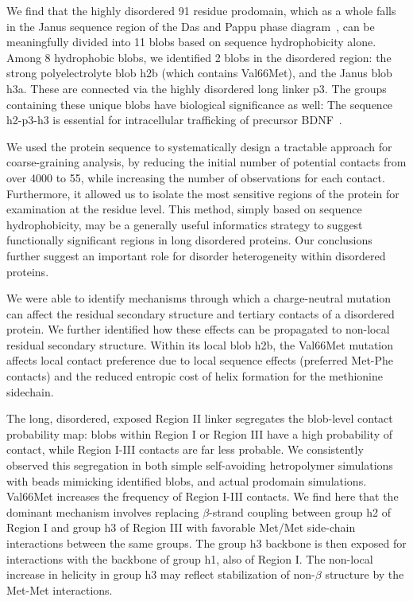 \documentclass[10pt,letterpaper]{article}
\begin{document}
We find that the highly disordered 91 residue prodomain, which as a whole falls in the Janus sequence region of the Das and Pappu phase diagram~\cite{Das2013}, can be meaningfully divided into 11 blobs based on sequence hydrophobicity alone. Among 8 hydrophobic blobs, we identified 2 blobs in the disordered region: the strong polyelectrolyte blob h2b (which contains Val66Met), and the Janus blob h3a. These are connected via the highly disordered long linker p3. The groups containing these unique blobs have biological significance as well: The sequence h2-p3-h3 is essential for intracellular trafficking of precursor BDNF~\cite{Chen2005}. 

We used the protein sequence to systematically design a tractable approach for coarse-graining analysis, by reducing the initial number of potential contacts from over 4000 to 55, while increasing the number of observations for each contact. Furthermore, it allowed us to isolate the most sensitive regions of the protein for examination at the residue level. This method, simply based on sequence hydrophobicity, may be a generally useful informatics strategy to suggest functionally significant regions in long disordered proteins. Our conclusions further suggest an important role for disorder heterogeneity within disordered proteins. 

We were able to identify mechanisms through which a charge-neutral mutation can affect the residual secondary structure and tertiary contacts of a disordered protein. We further identified how these effects can be propagated to non-local residual secondary structure. Within its local blob h2b, the Val66Met mutation affects local contact preference due to local sequence effects (preferred Met-Phe contacts) and the reduced entropic cost of helix formation for the methionine sidechain.

The long, disordered, exposed Region II linker segregates the blob-level contact probability map: blobs within Region I or Region III have a high probability of contact, while Region I-III contacts are far less probable. We consistently observed this segregation in both simple self-avoiding hetropolymer simulations with beads mimicking identified blobs, and actual prodomain simulations. Val66Met increases the frequency of Region I-III contacts. We find here that the dominant mechanism involves replacing $\beta$-strand coupling between group h2 of Region I and group h3 of Region III with favorable Met/Met side-chain interactions between the same groups. The group h3 backbone is then exposed for interactions with the backbone of group h1, also of Region I. The non-local increase in helicity in group h3 may reflect stabilization of non-$\beta$ structure by the Met-Met interactions.
\end{document}
